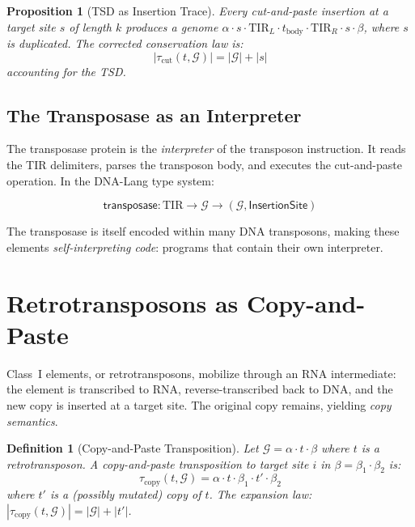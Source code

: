 \documentclass[12pt,a4paper]{article}
\newtheorem{proposition}[theorem]{Proposition}
\newtheorem{definition}[theorem]{Definition}
\newcommand{\Genome}{\mathcal{G}}
\begin{document}
\begin{proposition}[TSD as Insertion Trace]\label{prop:tsd}
Every cut-and-paste insertion at a target site $s$ of length $k$ produces a genome
$\alpha \cdot s \cdot \mathrm{TIR}_L \cdot t_{\mathrm{body}} \cdot \mathrm{TIR}_R
\cdot s \cdot \beta$, where $s$ is duplicated. The corrected conservation law is:
\[
  |\tau_{\mathrm{cut}}(t, \Genome)| = |\Genome| + |s|
\]
accounting for the TSD.
\end{proposition}

\subsection{The Transposase as an Interpreter}

The transposase protein is the \emph{interpreter} of the transposon instruction.
It reads the TIR delimiters, parses the transposon body, and executes the
cut-and-paste operation. In the DNA-Lang type system:

\[
  \mathsf{transposase} : \mathrm{TIR} \to \Genome \to (\Genome, \mathsf{InsertionSite})
\]

The transposase is itself encoded within many DNA transposons, making these elements
\emph{self-interpreting code}: programs that contain their own interpreter.


\section{Retrotransposons as Copy-and-Paste}\label{sec:copy-paste}

Class~I elements, or retrotransposons, mobilize through an RNA intermediate: the
element is transcribed to RNA, reverse-transcribed back to DNA, and the new copy
is inserted at a target site. The original copy remains, yielding \emph{copy semantics}.

\begin{definition}[Copy-and-Paste Transposition]\label{def:copy-paste}
Let $\Genome = \alpha \cdot t \cdot \beta$ where $t$ is a retrotransposon. A
copy-and-paste transposition to target site $i$ in $\beta = \beta_1 \cdot \beta_2$ is:
\[
  \tau_{\mathrm{copy}}(t, \Genome) = \alpha \cdot t \cdot \beta_1 \cdot t' \cdot \beta_2
\]
where $t'$ is a (possibly mutated) copy of $t$. The \emph{expansion law}:
$|\tau_{\mathrm{copy}}(t, \Genome)| = |\Genome| + |t'|$.
\end{definition}
\end{document}

